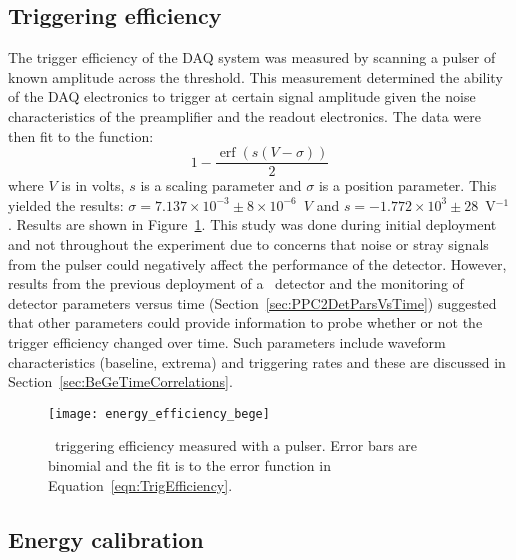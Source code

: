 		\subsection{Triggering efficiency}
		\label{sec:BeGeTrigEff}

The trigger efficiency of the DAQ system was measured by scanning a pulser of known amplitude across the threshold.  %
This measurement determined the ability of the DAQ electronics to trigger at certain signal amplitude given the noise characteristics of the preamplifier and the readout electronics.  The data were then fit to the function:
			\begin{equation}
				1 - \frac{\operatorname{erf} \left(s(V-\sigma)\right)}{2}
				\label{eqn:TrigEfficiency}
			\end{equation}
where $V$ is in volts, $s$ is a scaling parameter and $\sigma$ is a position parameter.  This yielded the results: $\sigma = 7.137\times10^{-3}\pm8\times10^{-6}$~$V$ and $s = -1.772\times10^{3}\pm28$~V$^{-1}$.  Results are shown in Figure~\ref{fig:BeGeTriggeringEfficiency}.  This study was done during initial deployment and not throughout the experiment due to concerns that noise or stray signals from the pulser could negatively affect the performance of the detector.  However, results from the previous deployment of a \ppc~detector and the monitoring of detector parameters versus time (Section~\ref{sec:PPC2DetParsVsTime}) suggested that other parameters could provide information to probe whether or not the trigger efficiency changed over time.  Such parameters include waveform characteristics (baseline, extrema) and triggering rates and these are discussed in Section~\ref{sec:BeGeTimeCorrelations}.

			\begin{figure}
				\centering
				\texttt{[image: energy\_efficiency\_bege]}
				\caption[\bege~triggering efficiency measured with a pulser]
				{\bege~triggering efficiency measured with a pulser.  Error bars are binomial and the fit is to the error function in
				Equation~\ref{eqn:TrigEfficiency}.}
				\label{fig:BeGeTriggeringEfficiency}
			\end{figure}

		\subsection{Energy calibration}

